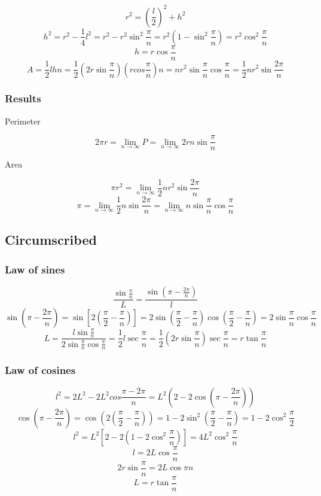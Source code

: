 \documentclass{article}
\begin{document}
$$r^2 = \left(\frac{l}{2}\right)^2 + h^2$$
$$h^2 = r^2 - \frac{1}{4}l^2
= r^2 - r^2\sin^2\frac{\pi}{n}
= r^2\left(1 - \sin^2\frac{\pi}{n}\right)
= r^2\cos^2\frac{\pi}{n}$$
$$h = r\cos\frac{\pi}{n}$$
$$A = \frac{1}{2}lhn
= \frac{1}{2}\left(2r\sin\frac{\pi}{n}\right)\left(rcos\frac{\pi}{n}\right)n
= nr^2\sin\frac{\pi}{n}\cos\frac{\pi}{n}
= \frac{1}{2}nr^2\sin\frac{2\pi}{n}$$

\subsubsection{Results}

Perimeter

$$2\pi{r} = \lim_{n\to\infty} P
= \lim_{n\to\infty} 2rn\sin\frac{\pi}{n}$$

Area

$$\pi{r^2} = \lim_{n\to\infty} \frac{1}{2}nr^2\sin\frac{2\pi}{n}$$
$$\pi = \lim_{n\to\infty} \frac{1}{2}n\sin\frac{2\pi}{n}
= \lim_{n\to\infty} n\sin\frac{\pi}{n}\cos\frac{\pi}{n}$$

\subsection{Circumscribed}

\subsubsection{Law of sines}

$$\frac{\sin\frac{\pi}{n}}{L} = \frac{\sin\left(\pi - \frac{2\pi}{n}\right)}{l}$$
$$\sin\left(\pi - \frac{2\pi}{n}\right) = \sin\left[2\left(\frac{\pi}{2} - \frac{\pi}{n}\right)\right]
= 2\sin\left(\frac{\pi}{2} - \frac{\pi}{n}\right)\cos\left(\frac{\pi}{2} - \frac{\pi}{n}\right)
= 2\sin\frac{\pi}{n}\cos\frac{\pi}{n}$$
$$L = \frac{l\sin\frac{\pi}{n}}{2\sin\frac{\pi}{n}\cos\frac{\pi}{n}}
= \frac{1}{2}l\sec\frac{\pi}{n}
= \frac{1}{2}\left(2r\sin\frac{\pi}{n}\right)\sec\frac{\pi}{n}
= r\tan\frac{\pi}{n}$$

\subsubsection{Law of cosines}

$$l^2 = 2L^2 - 2L^2cos\frac{\pi - 2\pi}{n}
= L^2\left(2 - 2\cos\left(\pi - \frac{2\pi}{n}\right)\right)$$
$$\cos\left(\pi - \frac{2\pi}{n}\right) = \cos\left(2\left(\frac{\pi}{2} - \frac{\pi}{n}\right)\right)
= 1 - 2\sin^2\left(\frac{\pi}{2} - \frac{\pi}{n}\right)
= 1 - 2\cos^2\frac{\pi}{2}$$
$$l^2 = L^2\left[2 - 2\left(1 - 2\cos^2\frac{\pi}{n}\right)\right]
= 4L^2\cos^2\frac{\pi}{n}$$
$$l = 2L\cos\frac{\pi}{n}$$
$$2r\sin\frac{\pi}{n} = 2L\cos{\pi}{n}$$
$$L = r\tan\frac{\pi}{n}$$
\end{document}
